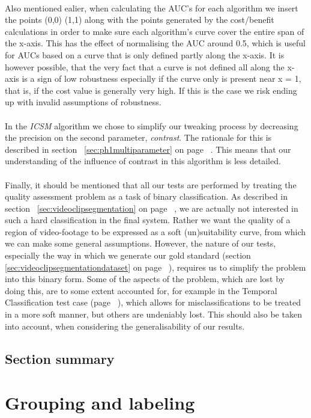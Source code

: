 \documentclass[12pt]{article}
\begin{document}
\\
Also mentioned ealier, when calculating the AUC's for each algorithm we insert the points (0,0) (1,1) along with the points generated by the cost/benefit calculations in order to make sure each algorithm's curve cover the entire span of the x-axis. This has the effect of normalising the AUC around 0.5, which is useful for AUCs based on a curve that is only defined partly along the x-axis. It is however possible, that the very fact that a curve is not defined all along the x-axis is a sign of low robustness especially if the curve only is present near x = 1, that is, if the cost value is generally very high. If this is the case we risk ending up with invalid assumptions of robustness.\\
\\
In the \textit{ICSM} algorithm we chose to simplify our tweaking process by decreasing the precision on the second parameter, \textit{contrast}. The rationale for this is described in section~ \ref{sec:ph1multiparameter} on page ~\pageref{sec:ph1multiparameter}. This means that our understanding of the influence of contrast in this algorithm is less detailed.\\
\\
Finally, it should be mentioned that all our tests are performed by treating the quality assessment problem as a task of binary classification. As described in section~ \ref{sec:videoclipsegmentation} on page ~\pageref{sec:videoclipsegmentation}, we are actually not interested in such a hard classification in the final system. Rather we want the quality of a region of video-footage to be expressed as a soft (un)suitability curve, from which we can make some general assumptions. However, the nature of our tests, especially the way in which we generate our gold standard (section~ \ref{sec:videoclipsegmentationdataset} on page ~\pageref{sec:videoclipsegmentationdataset}), requires us to simplify the problem into this binary form. Some of the aspects of the problem, which are lost by doing this, are to some extent accounted for, for example in the Temporal Classification test case (page ~\pageref{sec:tctestcase}), which allows for misclassifications to be treated in a more soft manner, but others are undeniably lost. This should also be taken into account, when considering the generalisability of our results.
%
\subsection{Section summary}
%
\section{Grouping and labeling}
%
\end{document}

